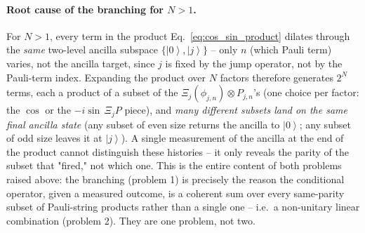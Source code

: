 \documentclass[11pt]{article}
\renewcommand{\ket}[1]{\left| #1 \right\rangle}
\begin{document}
\paragraph{Root cause of the branching for $N>1$.} For $N>1$, every term in the product Eq.~\eqref{eq:cos_sin_product} dilates through the \emph{same} two-level ancilla subspace $\{\ket0,\ket j\}$ -- only $n$ (which Pauli term) varies, not the ancilla target, since $j$ is fixed by the jump operator, not by the Pauli-term index. Expanding the product over $N$ factors therefore generates $2^N$ terms, each a product of a subset of the $\Xi_j(\phi_{j,n})\otimes P_{j,n}$'s (one choice per factor: the $\cos$ or the $-i\sin\,\Xi_jP$ piece), and \emph{many different subsets land on the same final ancilla state} (any subset of even size returns the ancilla to $\ket0$; any subset of odd size leaves it at $\ket j$). A single measurement of the ancilla at the end of the product cannot distinguish these histories -- it only reveals the parity of the subset that "fired," not which one. This is the entire content of both problems raised above: the branching (problem 1) is precisely the reason the conditional operator, given a measured outcome, is a coherent sum over every same-parity subset of Pauli-string products rather than a single one -- i.e.\ a non-unitary linear combination (problem 2). They are one problem, not two.
\end{document}
